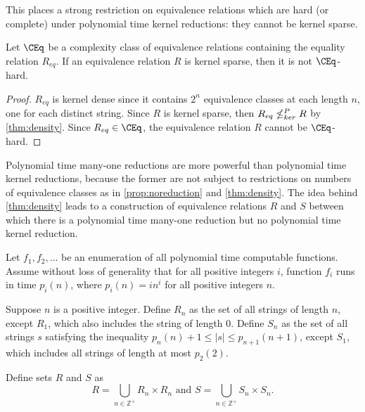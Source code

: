 This places a strong restriction on equivalence relations which are hard (or complete) under polynomial time kernel reductions: they cannot be kernel sparse.

\begin{corollary}
  Let $\CEq$ be a complexity class of equivalence relations containing the equality relation $R_{eq}$.
  If an equivalence relation $R$ is kernel sparse, then it is not $\CEq$-hard.
\end{corollary}
\begin{proof}
  $R_{eq}$ is kernel dense since it contains $2^n$ equivalence classes at each length $n$, one for each distinct string.
  Since $R$ is kernel sparse, then $R_{eq} \nleq^{P}_{ker} R$ by \autoref{thm:density}.
  Since $R_{eq} \in \CEq$, the equivalence relation $R$ cannot be $\CEq$-hard.
\end{proof}

Polynomial time many-one reductions are more powerful than polynomial time kernel reductions, because the former are not subject to restrictions on numbers of equivalence classes as in \autoref{prop:noreduction} and \autoref{thm:density}.
The idea behind \autoref{thm:density} leads to a construction of equivalence relations $R$ and $S$ between which there is a polynomial time many-one reduction but no polynomial time kernel reduction.

\begin{construction}\label{con:rands}
  Let $f_1, f_2, \dotsc$ be an enumeration of all polynomial time computable functions.
  Assume without loss of generality  that for all positive integers $i$, function $f_i$ runs in time $p_i(n)$, where $p_i(n) = i n^i$ for all positive integers $n$.

  Suppose $n$ is a positive integer.
  Define $R_n$ as the set of all strings of length $n$, except $R_1$, which also includes the string of length $0$.
  Define $S_n$ as the set of all strings $s$ satisfying the inequality $p_n(n) + 1 \leq |s| \leq p_{n + 1}(n + 1)$, except $S_1$, which includes all strings of length at most $p_2(2)$.

  Define sets $R$ and $S$ as
  \begin{equation*}
    R = \bigcup_{n \in \mathbb{Z}^+} R_n \times R_n \text{ and } S = \bigcup_{n \in \mathbb{Z}^+} S_n \times S_n.
  \end{equation*}
\end{construction}

